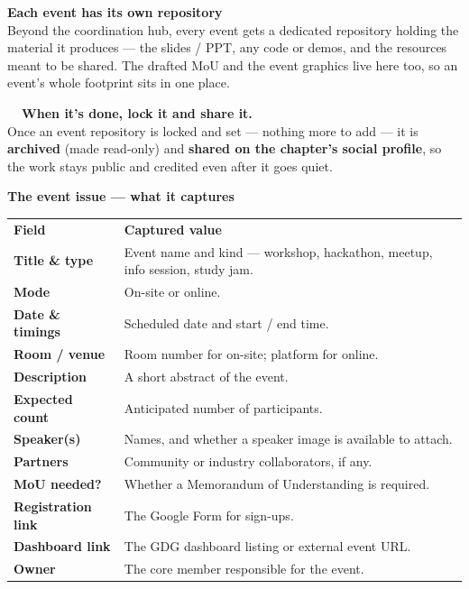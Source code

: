 \documentclass[11pt,a4paper]{article}
\begin{document}
{\bfseries\color{Ink}Each event has its own repository}\\[2pt]
Beyond the coordination hub, every event gets a dedicated repository holding the material it produces
— the slides / PPT, any code or demos, and the resources meant to be shared. The drafted MoU and the
event graphics live here too, so an event's whole footprint sits in one place.

\vspace{4pt}
\begin{tcolorbox}[enhanced,colback=Mist,colframe=Mist,arc=4pt,left=14pt,right=14pt,top=9pt,bottom=9pt,
    borderline west={3pt}{0pt}{GGrn}]
  {\bfseries\color{Ink}~~When it's done, lock it and share it.}\\[2pt]
  {\small\color{Slate}Once an event repository is locked and set — nothing more to add — it is
  \textbf{archived} (made read-only) and \textbf{shared on the chapter's social profile}, so the work
  stays public and credited even after it goes quiet.}
\end{tcolorbox}

\vspace{14pt}
{\bfseries\color{Ink}The event issue — what it captures}
\par\vspace{8pt}
\renewcommand{\arraystretch}{1.15}\begin{tabularx}{\linewidth}{@{}>{\raggedright\arraybackslash}p{3.7cm} X@{}}\textbf{Field} & \textbf{Captured value} \\[3pt]\arrayrulecolor{Line}\hline\rule{0pt}{2.4ex}\textbf{Title \& type} & Event name and kind — workshop, hackathon, meetup, info session, study jam. \\[4pt]\textbf{Mode} & On-site or online. \\[4pt]\textbf{Date \& timings} & Scheduled date and start / end time. \\[4pt]\textbf{Room / venue} & Room number for on-site; platform for online. \\[4pt]\textbf{Description} & A short abstract of the event. \\[4pt]\textbf{Expected count} & Anticipated number of participants. \\[4pt]\textbf{Speaker(s)} & Names, and whether a speaker image is available to attach. \\[4pt]\textbf{Partners} & Community or industry collaborators, if any. \\[4pt]\textbf{MoU needed?} & Whether a Memorandum of Understanding is required. \\[4pt]\textbf{Registration link} & The Google Form for sign-ups. \\[4pt]\textbf{Dashboard link} & The GDG dashboard listing or external event URL. \\[4pt]\textbf{Owner} & The core member responsible for the event. \\[4pt]\end{tabularx}
\clearpage
\end{document}
